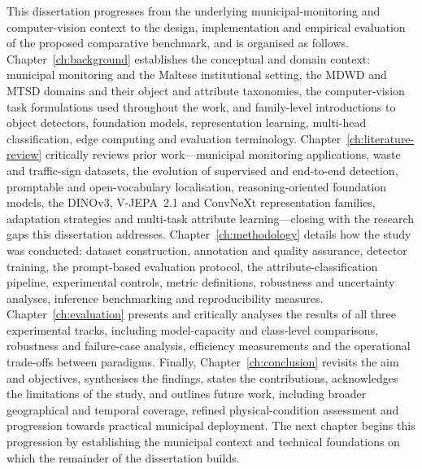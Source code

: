 This dissertation progresses from the underlying municipal-monitoring and computer-vision context to the design, implementation and empirical evaluation of the proposed comparative benchmark, and is organised as follows. Chapter~\ref{ch:background} establishes the conceptual and domain context: municipal monitoring and the Maltese institutional setting, the MDWD and MTSD domains and their object and attribute taxonomies, the computer-vision task formulations used throughout the work, and family-level introductions to object detectors, foundation models, representation learning, multi-head classification, edge computing and evaluation terminology. Chapter~\ref{ch:literature-review} critically reviews prior work---municipal monitoring applications, waste and traffic-sign datasets, the evolution of supervised and end-to-end detection, promptable and open-vocabulary localisation, reasoning-oriented foundation models, the DINOv3, V-JEPA~2.1 and ConvNeXt representation families, adaptation strategies and multi-task attribute learning---closing with the research gaps this dissertation addresses. Chapter~\ref{ch:methodology} details how the study was conducted: dataset construction, annotation and quality assurance, detector training, the prompt-based evaluation protocol, the attribute-classification pipeline, experimental controls, metric definitions, robustness and uncertainty analyses, inference benchmarking and reproducibility measures. Chapter~\ref{ch:evaluation} presents and critically analyses the results of all three experimental tracks, including model-capacity and class-level comparisons, robustness and failure-case analysis, efficiency measurements and the operational trade-offs between paradigms. Finally, Chapter~\ref{ch:conclusion} revisits the aim and objectives, synthesises the findings, states the contributions, acknowledges the limitations of the study, and outlines future work, including broader geographical and temporal coverage, refined physical-condition assessment and progression towards practical municipal deployment. The next chapter begins this progression by establishing the municipal context and technical foundations on which the remainder of the dissertation builds.

